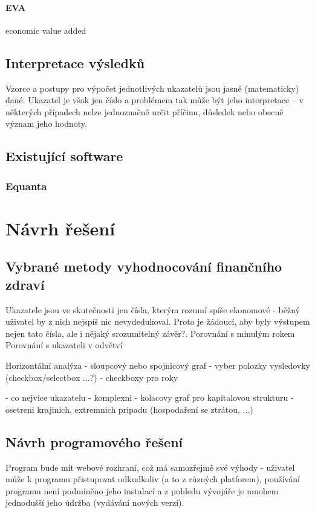\subsubsection{EVA}
economic value added



\section{Interpretace výsledků}
Vzorce a postupy pro výpočet jednotlivých ukazatelů jsou jasně (matematicky) dané. Ukazatel je však jen číslo a problémem tak může být jeho interpretace -- v některých případech nelze jednoznačně určit příčinu, důsledek nebo obecně význam jeho hodnoty. 

\section{Existující software}
\subsection{Equanta\sffamily\textregistered}

\chapter{Návrh řešení}
\section{Vybrané metody vyhodnocování finančního zdraví}
Ukazatele jsou ve skutečnosti jen čísla, kterým rozumí spíše ekonomové - běžný uživatel by z nich nejspíš nic nevydedukoval. Proto je žádoucí, aby byly výstupem nejen tato čísla, ale i nějaký srozumitelný závěr?.
Porovnání s minulým rokem
Porovnání s ukazateli v odvětví

Horizontální analýza
- sloupcový nebo spojnicový graf
- vyber polozky vysledovky (checkbox/selectbox ...?)
- checkboxy pro roky

- co nejvice ukazatelu - komplexni
- kolacovy graf pro kapitalovou strukturu
- osetreni krajinich, extremnich pripadu (hospodaření se ztrátou, ...)

\section{Návrh programového řešení}
Program bude mít webové rozhraní, což má samozřejmě své výhody - uživatel může k programu přistupovat odkudkoliv (a to z různých platforem), používání programu není podmíněno jeho instalací a z pohledu vývojáře je mnohem jednodušší jeho údržba (vydávání nových verzí).

